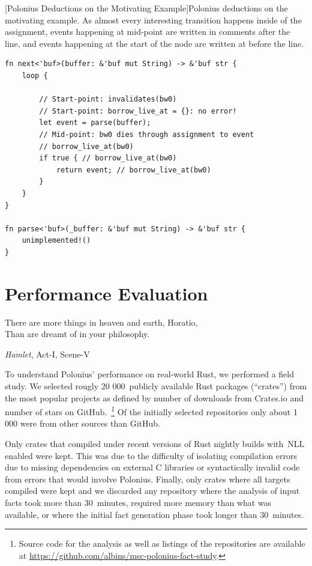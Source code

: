 \documentclass[11pt,a4paper,twoside,openany]{report}
\newenvironment{sourcecode}{\captionsetup{type=listing}}{}
\begin{document}
\begin{sourcecode}
  [Polonius Deductions on the Motivating Example]{Polonius
    deductions on the motivating
    example. As almost every interesting transition happens inside of the
    assignment, events happening at mid-point are written in comments after the
    line, and events happening at the start of the node are written at before
    the line.}\label{lst:motivating-example-deductions}
\begin{verbatim}
fn next<'buf>(buffer: &'buf mut String) -> &'buf str {
    loop {

        // Start-point: invalidates(bw0)
        // Start-point: borrow_live_at = {}: no error!
        let event = parse(buffer); 
        // Mid-point: bw0 dies through assignment to event
        // borrow_live_at(bw0)
        if true { // borrow_live_at(bw0)
            return event; // borrow_live_at(bw0)
        }
    }
}

fn parse<'buf>(_buffer: &'buf mut String) -> &'buf str {
    unimplemented!()
}
\end{verbatim}
\end{sourcecode}


\chapter{Performance Evaluation}\label{sec:field-study-borrow}
\epigraph{There are more things in heaven and earth, Horatio,\\
  Than are dreamt of in your philosophy.}{\textit{Hamlet}, Act-I, Scene-V}

To understand Polonius' performance on real-world Rust, we performed a field
study. We selected rougly 20 000~publicly available Rust packages (``crates'')
from the most popular projects as defined by number of downloads from Crates.io
and number of stars on GitHub.~\footnote{Source code for the analysis as well as
  listings of the repositories are available at
  \url{https://github.com/albins/msc-polonius-fact-study}.} Of the initially selected repositories only about 1 000 were from other sources
than GitHub.

Only crates that compiled under recent versions of Rust nightly builds with~NLL
enabled were kept. This was due to the difficulty of isolating compilation
errors due to missing dependencies on external C libraries or syntactically
invalid code from errors that would involve Polonius. Finally, only crates where
all targets compiled were kept and we discarded any repository where the
analysis of input facts took more than 30~minutes, required more memory than
what was available, or where the initial fact generation phase took longer than
30~minutes.
\end{document}
